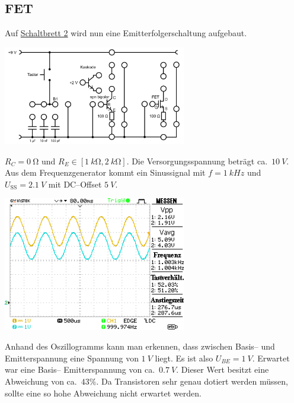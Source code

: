 \documentclass[10pt]{article}
\newenvironment{Figure}
  {\par\medskip\noindent\minipage{\linewidth}}
  {\endminipage\par\medskip}
\begin{document}
\begin{multicols}{2}
        \subsection{FET}
        Auf \hyperref[fig:schaltbrett_2]{Schaltbrett 2} wird nun eine Emitterfolgerschaltung aufgebaut.
        \begin{Figure}
                \centering
                \includegraphics[width=0.6\textwidth]{schaltbrett_2.png}
                 \label{fig:schaltbrett_2}
        \end{Figure}
        $R_C=\SI{0}{\ohm}$ und $R_E \in \left[\SI{1}{k\ohm},\SI{2}{k\ohm}\right]$. 
        Die Versorgungsspannung beträgt ca.\ $\SI{10}{V}$.
        Aus dem Frequenzgenerator kommt ein Sinussignal mit $f=\SI{1}{kHz}$ und $U_{\text{SS}}=\SI{2.1}{V}$ mit DC--Offset $\SI{5}{V}$.
        \begin{Figure}
                \centering
                \includegraphics[width=0.6\textwidth]{../data/DS0011.png}
        \end{Figure}
        Anhand des Oszillogramms kann man erkennen, dass zwischen Basis-- und Emitterspannung eine Spannung von $\SI{1}{V}$ liegt.
        Es ist also $U_{BE}=\SI{1}{V}$.
        Erwartet war eine Basis-- Emitterspannung von ca.\ $\SI{0.7}{V}$.
        Dieser Wert besitzt eine Abweichung von ca.\ $43\%$.
        Da Transistoren sehr genau dotiert werden müssen, sollte eine so hohe Abweichung nicht erwartet werden.

\end{multicols}
\end{document}
